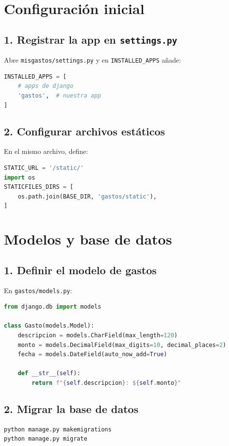 \documentclass[12pt,a4paper]{article}
\begin{document}
\section{Configuración inicial}

\subsection{1. Registrar la app en \texttt{settings.py}}
Abre \texttt{misgastos/settings.py} y en \texttt{INSTALLED\_APPS} añade:
\begin{lstlisting}[language=Python]
INSTALLED_APPS = [
    # apps de django
    'gastos',  # nuestra app
]
\end{lstlisting}

\subsection{2. Configurar archivos estáticos}
En el mismo archivo, define:
\begin{lstlisting}[language=Python]
STATIC_URL = '/static/'
import os
STATICFILES_DIRS = [
    os.path.join(BASE_DIR, 'gastos/static'),
]
\end{lstlisting}

\section{Modelos y base de datos}

\subsection{1. Definir el modelo de gastos}
En \texttt{gastos/models.py}:
\begin{lstlisting}[language=Python]
from django.db import models

class Gasto(models.Model):
    descripcion = models.CharField(max_length=120)
    monto = models.DecimalField(max_digits=10, decimal_places=2)
    fecha = models.DateField(auto_now_add=True)

    def __str__(self):
        return f"{self.descripcion}: ${self.monto}"
\end{lstlisting}

\subsection{2. Migrar la base de datos}
\begin{lstlisting}[language=bash]
python manage.py makemigrations
python manage.py migrate
\end{lstlisting}
\end{document}
